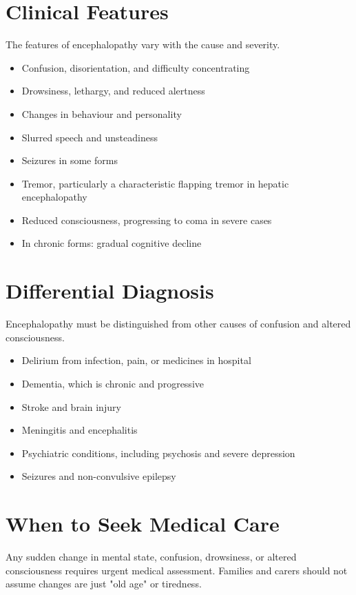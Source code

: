 \section*{Clinical Features}
The features of encephalopathy vary with the cause and severity.
\begin{itemize}
    \item Confusion, disorientation, and difficulty concentrating
    \item Drowsiness, lethargy, and reduced alertness
    \item Changes in behaviour and personality
    \item Slurred speech and unsteadiness
    \item Seizures in some forms
    \item Tremor, particularly a characteristic flapping tremor in hepatic encephalopathy
    \item Reduced consciousness, progressing to coma in severe cases
    \item In chronic forms: gradual cognitive decline
\end{itemize}

\section*{Differential Diagnosis}
Encephalopathy must be distinguished from other causes of confusion and altered consciousness.
\begin{itemize}
    \item Delirium from infection, pain, or medicines in hospital
    \item Dementia, which is chronic and progressive
    \item Stroke and brain injury
    \item Meningitis and encephalitis
    \item Psychiatric conditions, including psychosis and severe depression
    \item Seizures and non-convulsive epilepsy
\end{itemize}

\section*{When to Seek Medical Care}
Any sudden change in mental state, confusion, drowsiness, or altered consciousness requires urgent medical assessment. Families and carers should not assume changes are just "old age" or tiredness.

